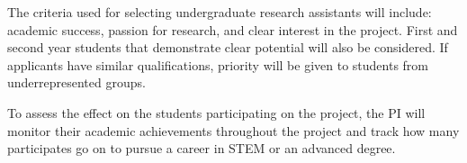 \documentclass[11pt]{article}
\begin{document}
    The criteria used for selecting undergraduate research assistants will include: academic success, passion for research, and clear interest in the project.
    First and second year students that demonstrate clear potential will also be considered.
    If applicants have similar qualifications, priority will be given to students from underrepresented groups.

    To assess the effect on the students participating on the project, the PI will monitor their academic achievements throughout the project and track how many participates go on to pursue a career in STEM or an advanced degree.
\end{document}

